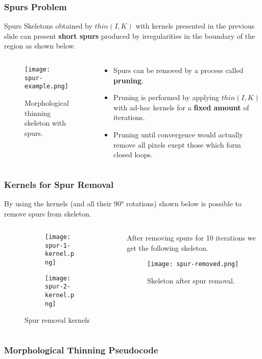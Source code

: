 \begin{frame}
  \frametitle{Spurs Problem}
  \begin{block}{Spurs}
    Skeletons obtained by $thin(I, K)$ with kernels presented in the previous slide can present \textbf{short spurs} produced by irregularities in the boundary of the region as shown below.
  \end{block}
  \begin{columns}
    \begin{column}{0.4\textwidth}
      \begin{figure}
        \texttt{[image: spur-example.png]}
        \caption{Morphological thinning skeleton with spurs.}
      \end{figure}
    \end{column}
    \begin{column}{0.6\textwidth}
      \begin{itemize}
        \item Spurs can be removed by a process called \textbf{pruning}.
        \item Pruning is performed by applying $thin(I, K)$ with ad-hoc kernels for a \textbf{fixed amount} of iterations.
        \item Pruning until convergence would actually remove all pixels exept those which form closed loops.
      \end{itemize}
    \end{column}
  \end{columns}
\end{frame}

\begin{frame}
  \frametitle{Kernels for Spur Removal}
  By using the kernels (and all their 90° rotations) shown below is possible to remove spurs from skeleton.
  \begin{columns}
    \begin{column}{0.5\textwidth}
      \begin{figure}
        \centering
        \begin{subfigure}[b]{0.5\textwidth}
          \centering
          \texttt{[image: spur-1-kernel.png]}
        \end{subfigure}
        \hfill
        \begin{subfigure}[b]{0.5\textwidth}
          \centering
          \texttt{[image: spur-2-kernel.png]}
        \end{subfigure}
        \caption{Spur removal kernels}
      \end{figure}
    \end{column}
    \begin{column}{0.5\textwidth}
      After removing spurs for 10 iterations we get the following skeleton.
      \begin{figure}
        \texttt{[image: spur-removed.png]}
        \caption{Skeleton after spur removal.}
      \end{figure}
    \end{column}
  \end{columns}
\end{frame}

\begin{frame}
  \frametitle{Morphological Thinning Pseudocode}
  
\end{frame}
